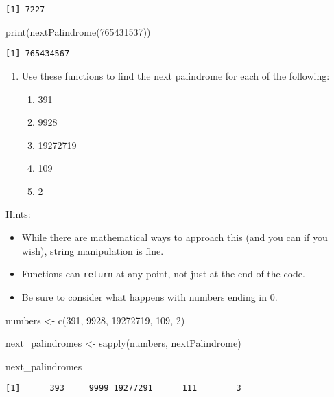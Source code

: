 \documentclass[
  letterpaper,
  DIV=11,
  numbers=noendperiod]{scrartcl}
\newenvironment{Shaded}{\begin{snugshade}}{\end{snugshade}}
\newcommand{\DecValTok}[1]{\textcolor[rgb]{0.68,0.00,0.00}{#1}}
\newcommand{\FunctionTok}[1]{\textcolor[rgb]{0.28,0.35,0.67}{#1}}
\newcommand{\NormalTok}[1]{\textcolor[rgb]{0.00,0.23,0.31}{#1}}
\newcommand{\OtherTok}[1]{\textcolor[rgb]{0.00,0.23,0.31}{#1}}
\begin{document}
\begin{verbatim}
[1] 7227
\end{verbatim}

\begin{Shaded}
\begin{Highlighting}[]
\FunctionTok{print}\NormalTok{(}\FunctionTok{nextPalindrome}\NormalTok{(}\DecValTok{765431537}\NormalTok{))}
\end{Highlighting}
\end{Shaded}

\begin{verbatim}
[1] 765434567
\end{verbatim}

\begin{enumerate}
\def\labelenumi{\alph{enumi}.}
\setcounter{enumi}{2}
\item
  Use these functions to find the next palindrome for each of the
  following:

  \begin{enumerate}
  \def\labelenumii{\roman{enumii}.}
  \item
    391
  \item
    9928
  \item
    19272719
  \item
    109
  \item
    2
  \end{enumerate}
\end{enumerate}

Hints:

\begin{itemize}
\item
  While there are mathematical ways to approach this (and you can if you
  wish), string manipulation is fine.
\item
  Functions can \texttt{return} at any point, not just at the end of the
  code.
\item
  Be sure to consider what happens with numbers ending in 0.
\end{itemize}

\begin{Shaded}
\begin{Highlighting}[]
\NormalTok{numbers }\OtherTok{\textless{}{-}} \FunctionTok{c}\NormalTok{(}\DecValTok{391}\NormalTok{, }\DecValTok{9928}\NormalTok{, }\DecValTok{19272719}\NormalTok{, }\DecValTok{109}\NormalTok{, }\DecValTok{2}\NormalTok{)}

\NormalTok{next\_palindromes }\OtherTok{\textless{}{-}} \FunctionTok{sapply}\NormalTok{(numbers, nextPalindrome)}

\NormalTok{next\_palindromes}
\end{Highlighting}
\end{Shaded}

\begin{verbatim}
[1]      393     9999 19277291      111        3
\end{verbatim}
\end{document}
